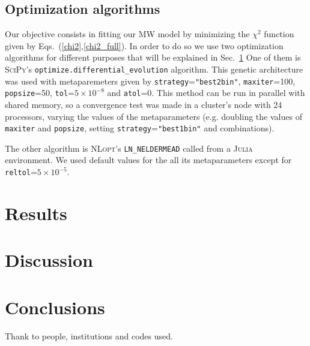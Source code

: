 \documentclass[twocolumn]{aa}
\begin{document}
\subsection{Optimization algorithms}
Our objective consists in fitting our MW model by minimizing the $\chi^2$ function given by Eqs.~(\ref{chi2},\ref{chi2_full}).  In order to do so we use two optimization algorithms for different purposes
that will be explained in Sec.~\ref{sec:results}
One of them is {\scshape{SciPy}}'s
\texttt{optimize.differential\_evolution} algorithm. This genetic architecture
was used with metaparemeters given by
\texttt{strategy}=\texttt{"best2bin"}, \texttt{maxiter}=100, \texttt{popsize}=50,
\texttt{tol}=$5\times10^{-8}$ and \texttt{atol}=0. This method can be run in parallel with shared memory,
so a convergence test was made in a cluster's node with 24 processors, varying the values of the metaparameters (e.g. doubling the values of \texttt{maxiter} and \texttt{popsize}, setting \texttt{strategy}=\texttt{"best1bin"} and combinations).

The other algorithm is {\scshape{NLopt}}'s
\texttt{LN\_NELDERMEAD} called from a  {\scshape{Julia}}~\citep{bezanson2017julia}
environment. We used default values for the all its metaparameters except for
\texttt{reltol}=$5\times10^{-5}$.



\section{Results}
\label{sec:results}

\section{Discussion}
\label{sec: discussion}

\section{Conclusions}
\label{sec:conclusions}



\begin{acknowledgements}
    Thank to people, institutions and codes used.
\end{acknowledgements}

%
%
%
\end{document}
